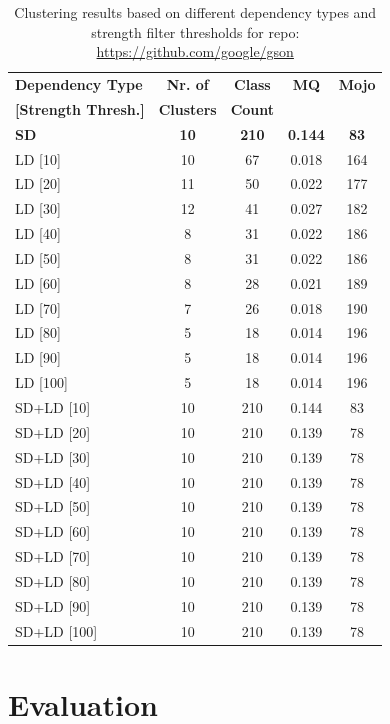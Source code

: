 \documentclass{ieeeaccess}
\begin{document}
\begin{table}[h]
\caption{Clustering results based on different dependency types and strength filter thresholds for repo: \href{https://github.com/google/gson}{https://github.com/google/gson}}
\label{tab:clustering_results_gson}
\centering
\setlength{\tabcolsep}{10pt}
\begin{tabular}{|l|c|c|c|c|}
\hline
\textbf{Dependency Type} & \textbf{Nr. of} & \textbf{Class} & \textbf{MQ} & \textbf{Mojo} \\
\textbf{[Strength Thresh.]} & \textbf{Clusters} & \textbf{Count} &  &  \\
\hline
\textbf{SD} & \textbf{10} & \textbf{210} & \textbf{0.144} & \textbf{83} \\
LD [10] & 10 & 67 & 0.018 & 164 \\
LD [20] & 11 & 50 & 0.022 & 177 \\
LD [30] & 12 & 41 & 0.027 & 182 \\
LD [40] & 8 & 31 & 0.022 & 186 \\
LD [50] & 8 & 31 & 0.022 & 186 \\
LD [60] & 8 & 28 & 0.021 & 189 \\
LD [70] & 7 & 26 & 0.018 & 190 \\
LD [80] & 5 & 18 & 0.014 & 196 \\
LD [90] & 5 & 18 & 0.014 & 196 \\
LD [100] & 5 & 18 & 0.014 & 196 \\
\hline
SD+LD [10] & 10 & 210 & 0.144 & 83 \\
SD+LD [20] & 10 & 210 & 0.139 & 78 \\
SD+LD [30] & 10 & 210 & 0.139 & 78 \\
SD+LD [40] & 10 & 210 & 0.139 & 78 \\
SD+LD [50] & 10 & 210 & 0.139 & 78 \\
SD+LD [60] & 10 & 210 & 0.139 & 78 \\
SD+LD [70] & 10 & 210 & 0.139 & 78 \\
SD+LD [80] & 10 & 210 & 0.139 & 78 \\
SD+LD [90] & 10 & 210 & 0.139 & 78 \\
SD+LD [100] & 10 & 210 & 0.139 & 78 \\
\hline
\end{tabular}
\end{table}



\section{Evaluation}
\label{sec:evaluation}
\end{document}
